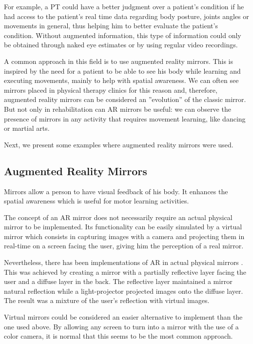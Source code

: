 For example, a PT could have a better judgment over a patient's condition if he 
had access to the patient's real time data regarding body posture, joints angles or movements in general, thus helping him to better evaluate the patient's condition. 
Without augmented information, this type of information could only be obtained through naked eye 
estimates or by using regular video recordings.

A common approach in this field is to use augmented reality mirrors. 
This is inspired by the need for a patient to be able to see his body while
learning and executing movements, mainly to help with spatial awareness. We can often
see mirrors placed in physical therapy clinics for this reason and, therefore, 
augmented reality mirrors can be considered an ''evolution'' of the classic mirror.
But not only in rehabilitation can \ac{AR} mirrors be useful: we can observe 
the presence of mirrors in any activity that requires movement learning, like dancing or martial arts.

Next, we present some examples where augmented reality mirrors were used.



\subsection{Augmented Reality Mirrors}
\label{RW-mirrors}
Mirrors allow a person to have visual feedback of his body. It enhances the spatial awareness which is useful for motor learning activities.

The concept of an \ac{AR} mirror does not necessarily require an 
actual physical mirror to be implemented. 
Its functionality can be easily simulated by a virtual mirror 
which consists in capturing images with a camera and projecting 
them in real-time on a screen facing the user, 
giving him the perception of a real mirror. 

Nevertheless, there has been implementations of \ac{AR} in actual physical mirrors \cite{Anderson}. 
This was achieved by creating a mirror with a partially reflective layer facing the user and a diffuse layer in the back. 
The reflective layer maintained a mirror natural reflection while a light-projector projected images onto the diffuse layer.
The result was a mixture of the user's reflection with virtual images.

Virtual mirrors could be considered an easier alternative to implement than the one used above. 
By allowing any screen to turn into a mirror with the use of a color camera, 
it is normal that this seems to be the most common approach.

